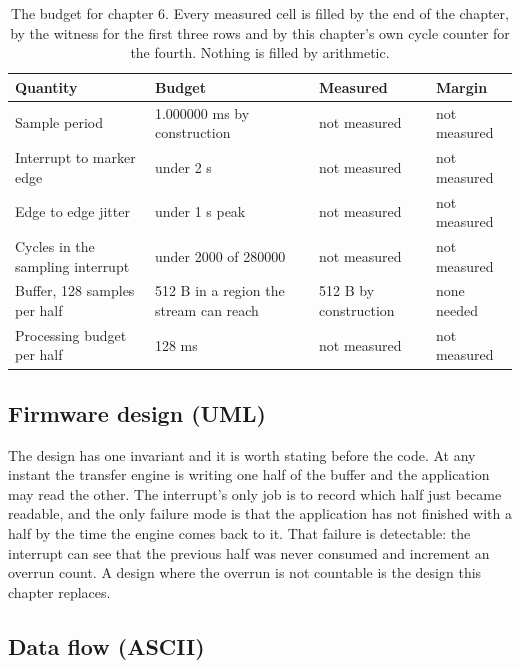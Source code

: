 \begin{table}[H]\centering\small
\begin{tabular}{p{44mm}p{28mm}p{28mm}p{30mm}}
\toprule
Quantity & Budget & Measured & Margin \\
\midrule
Sample period & 1.000000 ms by construction & not measured & not measured \\
Interrupt to marker edge & under 2 \textmu{}s & not measured & not measured \\
Edge to edge jitter & under 1 \textmu{}s peak & not measured & not measured \\
Cycles in the sampling interrupt & under 2000 of 280000 & not measured & not measured \\
Buffer, 128 samples per half & 512 B in a region the stream can reach & 512 B by construction & none needed \\
Processing budget per half & 128 ms & not measured & not measured \\
\bottomrule
\end{tabular}
\caption{The budget for chapter 6. Every measured cell is filled by the end of the chapter, by the witness for the first three rows and by this chapter's own cycle counter for the fourth. Nothing is filled by arithmetic.}
\end{table}

\subsection*{Firmware design (UML)}


The design has one invariant and it is worth stating before the code. At any
instant the transfer engine is writing one half of the buffer and the
application may read the other. The interrupt's only job is to record which
half just became readable, and the only failure mode is that the application
has not finished with a half by the time the engine comes back to it. That
failure is detectable: the interrupt can see that the previous half was never
consumed and increment an overrun count. A design where the overrun is not
countable is the design this chapter replaces.

\subsection*{Data flow (ASCII)}

